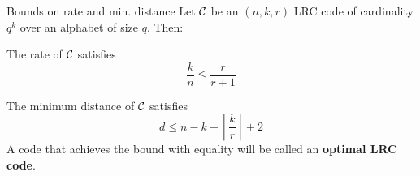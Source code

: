     
\begin{frame}{Bounds on rate and min. distance}
	Let $\mathcal{C}$ be an $(n,k,r)$ LRC code of cardinality $q^k$ over an alphabet of size $q$. Then:
    \begin{thm}
        The rate of $\mathcal{C}$ satisfies
        $$ \frac{k}{n} \leq \frac{r}{r+1} $$
    \end{thm}
    
    \begin{thm}
        The minimum distance of $\mathcal{C}$ satisfies
            $$d \leq n - k - \left\lceil \frac{k}{r} \right\rceil + 2$$
        A code that achieves the bound with equality will be called an \textbf{optimal LRC code}.
    \end{thm}
\end{frame}